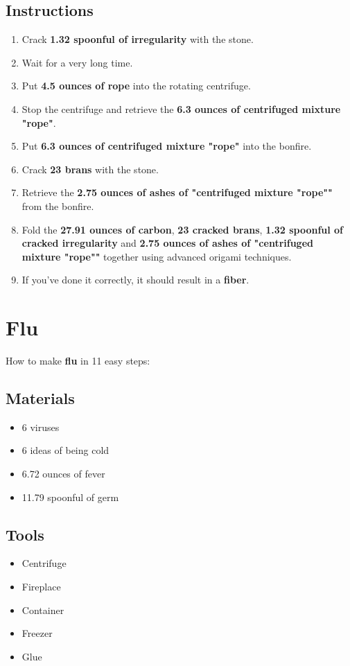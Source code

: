 \documentclass{article}
\begin{document}
\subsection{Instructions}\begin{enumerate}
\item 
Crack \textbf{1.32 spoonful of irregularity} with the stone.
\item 
Wait for a very long time.
\item 
Put \textbf{4.5 ounces of rope} into the rotating centrifuge.
\item 
Stop the centrifuge and retrieve the \textbf{6.3 ounces of centrifuged mixture "rope"}.
\item 
Put \textbf{6.3 ounces of centrifuged mixture "rope"} into the bonfire.
\item 
Crack \textbf{23 brans} with the stone.
\item 
Retrieve the \textbf{2.75 ounces of ashes of "centrifuged mixture "rope""} from the bonfire.
\item 
Fold the \textbf{27.91 ounces of carbon}, \textbf{23 cracked brans}, \textbf{1.32 spoonful of cracked irregularity} and \textbf{2.75 ounces of ashes of "centrifuged mixture "rope""} together using advanced origami techniques.
\item 
If you've done it correctly, it should result in a \textbf{fiber}.
\end{enumerate}
\newpage
\section{Flu}How to make \textbf{flu} in 11 easy steps:

\subsection{Materials}\begin{itemize}
\item 
6 viruses
\item 
6 ideas of being cold
\item 
6.72 ounces of fever
\item 
11.79 spoonful of germ
\end{itemize}
\subsection{Tools}\begin{itemize}
\item 
Centrifuge
\item 
Fireplace
\item 
Container
\item 
Freezer
\item 
Glue
\end{itemize}
\end{document}
